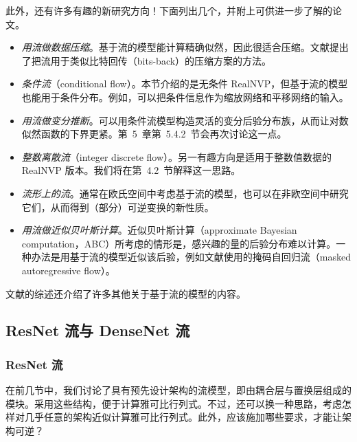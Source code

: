此外，还有许多有趣的新研究方向！下面列出几个，并附上可供进一步了解的论文。
\begin{itemize}
\item \emph{用流做数据压缩}。基于流的模型能计算精确似然，因此很适合压缩。文献提出了把流用于类似比特回传（bits-back）的压缩方案的方法。
\item \emph{条件流}（conditional flow）。本节介绍的是无条件 RealNVP，但基于流的模型也能用于条件分布。例如，可以把条件信息作为缩放网络和平移网络的输入。
\item \emph{用流做变分推断}。可以用条件流模型构造灵活的变分后验分布族，从而让对数似然函数的下界更紧。第~5~章第~5.4.2~节会再次讨论这一点。
\item \emph{整数离散流}（integer discrete flow）。另一有趣方向是适用于整数值数据的 RealNVP 版本。我们将在第~4.2~节解释这一思路。
\item \emph{流形上的流}。通常在欧氏空间中考虑基于流的模型，也可以在非欧空间中研究它们，从而得到（部分）可逆变换的新性质。
\item \emph{用流做近似贝叶斯计算}。近似贝叶斯计算（approximate Bayesian computation，ABC）所考虑的情形是，感兴趣的量的后验分布难以计算。一种办法是用基于流的模型近似该后验，例如文献使用的掩码自回归流（masked autoregressive flow）。
\end{itemize}

文献的综述还介绍了许多其他关于基于流的模型的内容。

\subsection{ResNet 流与 DenseNet 流}
\subsubsection[ResNet 流]{ResNet 流}

在前几节中，我们讨论了具有预先设计架构的流模型，即由耦合层与置换层组成的模块。采用这些结构，便于计算雅可比行列式。不过，还可以换一种思路，考虑怎样对几乎任意的架构近似计算雅可比行列式。此外，应该施加哪些要求，才能让架构可逆？


